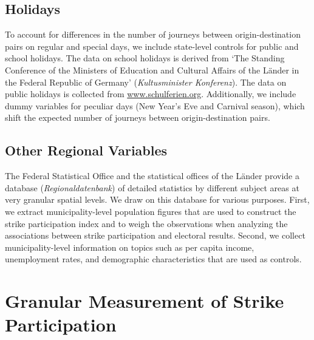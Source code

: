 \subsection{Holidays}
To account for differences in the number of journeys between origin-destination pairs on regular and special days, we include state-level controls for public and school holidays. The data on school holidays is derived from `The Standing Conference of the Ministers of Education and Cultural Affairs of the Länder in the Federal Republic of Germany' (\textit{Kultusminister Konferenz}). The data on public holidays is collected from \url{www.schulferien.org}. Additionally, we include dummy variables for peculiar days (New Year's Eve and Carnival season), which shift the expected number of journeys between origin-destination pairs.







\subsection{Other Regional Variables}
The Federal Statistical Office and the statistical offices of the Länder provide a database (\textit{Regionaldatenbank}) of detailed statistics by different subject areas at very granular spatial levels. We draw on this database for various purposes. First, we extract municipality-level population figures that are used to construct the strike participation index and to weigh the observations when analyzing the associations between strike participation and electoral results. Second, we collect municipality-level information on topics such as per capita income, unemployment rates, and demographic characteristics that are used as controls.










\bigskip
\section{Granular Measurement of Strike Participation}\label{sec_greta_cons:measurement_strike_participation}


